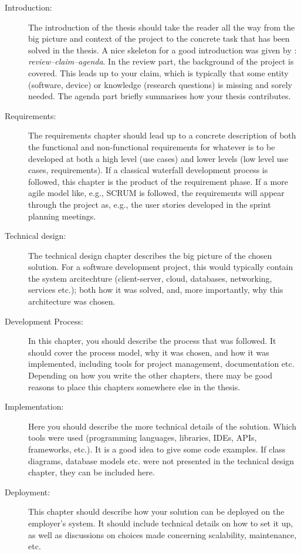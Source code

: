 \begin{description}
    \item[Introduction:] The introduction of the thesis should take the reader all the way from the big picture and context of the project to the concrete task that has been solved in the thesis. A nice skeleton for a good introduction was given by \textcite{claerbout1991scrutiny}: \emph{review–claim–agenda}. In the review part, the background of the project is covered. This leads up to your claim, which is typically that some entity (software, device) or knowledge (research questions) is missing and sorely needed. The agenda part briefly summarises how your thesis contributes.
    \item[Requirements:] The requirements chapter should lead up to a concrete description of both the functional and non-functional requirements for whatever is to be developed at both a high level (use cases) and lower levels (low level use cases, requirements). If a classical waterfall development process is followed, this chapter is the product of the requirement phase. If a more agile model like, e.g., SCRUM is followed, the requirements will appear through the project as, e.g., the user stories developed in the sprint planning meetings.
    \item[Technical design:] The technical design chapter describes the big picture of the chosen solution. For a software development project, this would typically contain the system arcitechture (client-server, cloud, databases, networking, services etc.); both how it was solved, and, more importantly, why this architecture was chosen.
    \item[Development Process:] In this chapter, you should describe the process that was followed. It should cover the process model, why it was chosen, and how it was implemented, including tools for project management, documentation etc. Depending on how you write the other chapters, there may be good reasons to place this chapters somewhere else in the thesis.
    \item[Implementation:] Here you should describe the more technical details of the solution. Which tools were used (programming languages, libraries, IDEs, APIs, frameworks, etc.). It is a good idea to give some code examples. If class diagrams, database models etc. were not presented in the technical design chapter, they can be included here.
    \item[Deployment:] This chapter should describe how your solution can be deployed on the employer's system. It should include technical details on how to set it up, as well as discussions on choices made concerning scalability, maintenance, etc.

\end{description}
